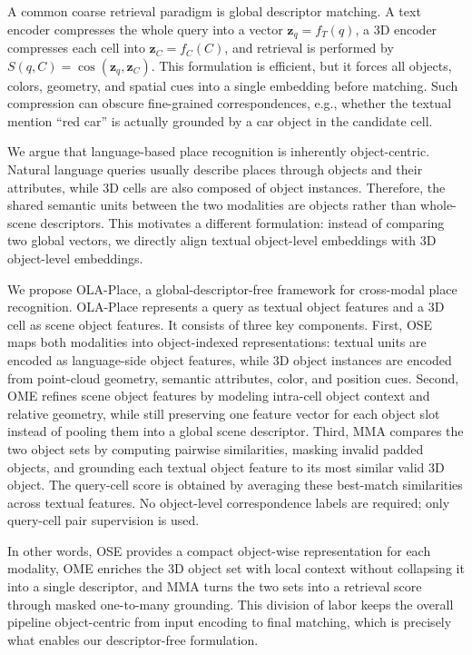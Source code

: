 \documentclass{article}
\begin{document}
A common coarse retrieval paradigm is global descriptor matching. A text encoder compresses the whole query into a vector $\mathbf{z}_q=f_T(q)$, a 3D encoder compresses each cell into $\mathbf{z}_C=f_C(C)$, and retrieval is performed by $S(q,C)=\cos(\mathbf{z}_q,\mathbf{z}_C)$. This formulation is efficient, but it forces all objects, colors, geometry, and spatial cues into a single embedding before matching. Such compression can obscure fine-grained correspondences, e.g., whether the textual mention ``red car'' is actually grounded by a car object in the candidate cell.

We argue that language-based place recognition is inherently object-centric. Natural language queries usually describe places through objects and their attributes, while 3D cells are also composed of object instances. Therefore, the shared semantic units between the two modalities are objects rather than whole-scene descriptors. This motivates a different formulation: instead of comparing two global vectors, we directly align textual object-level embeddings with 3D object-level embeddings.

We propose OLA-Place, a global-descriptor-free framework for cross-modal place recognition. OLA-Place represents a query as textual object features and a 3D cell as scene object features. It consists of three key components. First, OSE maps both modalities into object-indexed representations: textual units are encoded as language-side object features, while 3D object instances are encoded from point-cloud geometry, semantic attributes, color, and position cues. Second, OME refines scene object features by modeling intra-cell object context and relative geometry, while still preserving one feature vector for each object slot instead of pooling them into a global scene descriptor. Third, MMA compares the two object sets by computing pairwise similarities, masking invalid padded objects, and grounding each textual object feature to its most similar valid 3D object. The query-cell score is obtained by averaging these best-match similarities across textual features. No object-level correspondence labels are required; only query-cell pair supervision is used.

In other words, OSE provides a compact object-wise representation for each modality, OME enriches the 3D object set with local context without collapsing it into a single descriptor, and MMA turns the two sets into a retrieval score through masked one-to-many grounding. This division of labor keeps the overall pipeline object-centric from input encoding to final matching, which is precisely what enables our descriptor-free formulation.
\end{document}
